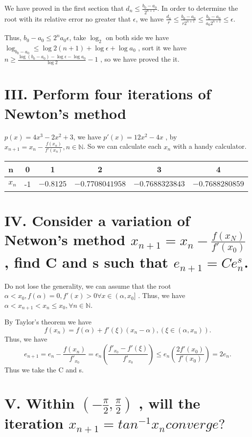 \documentclass[twoside,a4paper]{article}
\begin{document}
We have proved in the first section that 
$d_{n}\le \frac{b_0-a_0}{2^{n+1}}$. In order to determine the root with its relative error no greater that $\epsilon$, 
we have $\frac{d_{n}}{r}\le \frac{b_0-a_0}{r2^{n+1}}\le \frac{b_0-a_{0}}{a_{0}2^{n+1}}\le \epsilon$.

Thus, $b_0-a_0\le 2^{n}a_0\epsilon$, 
take $\log_2$ on both side we have $\log_{b_0-a_0}\le \log 2(n+1)+\log\epsilon+\log a_0$
, sort it we have $n\ge \frac{\log\left(b_0-a_0\right)-\log\epsilon-\log a_0 }{\log 2}-1$ 
, so we have proved the it.


\section*{III. \small{Perform four iterations of Newton's method}}

$p\left( x \right)=4x^3-2x^2+3$, we have $p'\left( x \right) =12x^2-4x$
, by $x_{n+1}=x_{n}-\frac{f\left( x_{n}\right) }{f'\left( x_{n} \right) }
, n\in\mathbb{N}$. 
So we can calculate each $x_{n}$ with a handy calculator. 

\begin{tabular}{|l|c|c|c|c|c|}
\hline
n&0&1&2&3&4\\
\hline
$x_{n}$ &-1&$-0.8125$ &$-0.7708041958$&$-0.7688323843$&$-0.7688280859$\\
\hline 
\end{tabular}

\section*{IV. \small{Consider a variation of Netwon's method $x_{n+1}=x_{n}-\frac{f\left( x_{N} \right) }{f'\left( x_0\right) }$
, find C and s such that $e_{n+1}=Ce_{n}^{s}$.}}

Do not lose the generality, we can assume that the root $\alpha<x_0
, f\left(  \alpha\right)=0, f'\left( x\right)>0 \forall x\in\left( \alpha,x_0]$ .
Thus, we have $\alpha<x_{n+1}< x_{n}\le x_0, \forall n\in\mathbb{N}$.	

By Taylor's theorem we have
 \[
	 f\left( x_{n} \right)=f\left( \alpha \right)+
	 f'\left(  \xi\right)\left( x_{n}-\alpha \right) 
	 ,\left(  \xi\in\left(  \alpha,x_{n}\right) \right)  
 .\] 
Thus, we have
\[
	e_{n+1}=e_{n}-\frac{f\left( x_{n} \right) }{f'_{x_0}}=
	e_{n}\left(  \frac{f'_{x_0}-f'\left( \xi \right) }{f'_{x_0}}\right)
	\le e_{n}\left(  \frac{2f'\left( x_0 \right) }{f'\left( x_0 \right) }\right) 
	=2e_{n}
.\] 
Thus we take the C and s.
\section*{V. \small{Within $\left( -\frac{\pi}{2},\frac{\pi}{2}\right) $
, will the iteration $x_{n+1}=tan^{-1}x_{n} converge?$}}
\end{document}
